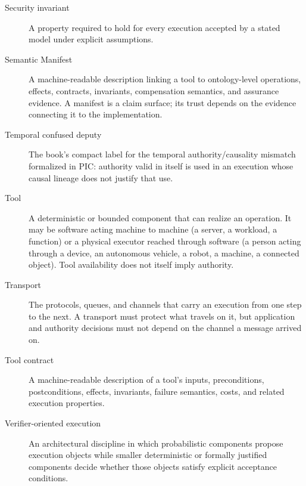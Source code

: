 \documentclass[10pt,oneside,openany]{book}
\begin{document}
\begin{description}
\item[Security invariant] A property required to hold for every execution accepted by a stated model under explicit assumptions.
\item[Semantic Manifest] A machine-readable description linking a tool to ontology-level operations, effects, contracts, invariants, compensation semantics, and assurance evidence. A manifest is a claim surface; its trust depends on the evidence connecting it to the implementation.
\item[Temporal confused deputy] The book's compact label for the temporal authority/causality mismatch formalized in PIC: authority valid in itself is used in an execution whose causal lineage does not justify that use.
\item[Tool] A deterministic or bounded component that can realize an operation. It may be software acting machine to machine (a server, a workload, a function) or a physical executor reached through software (a person acting through a device, an autonomous vehicle, a robot, a machine, a connected object). Tool availability does not itself imply authority.
\item[Transport] The protocols, queues, and channels that carry an execution from one step to the next. A transport must protect what travels on it, but application and authority decisions must not depend on the channel a message arrived on.
\item[Tool contract] A machine-readable description of a tool's inputs, preconditions, postconditions, effects, invariants, failure semantics, costs, and related execution properties.
\item[Verifier-oriented execution] An architectural discipline in which probabilistic components propose execution objects while smaller deterministic or formally justified components decide whether those objects satisfy explicit acceptance conditions.
\end{description}
\end{document}
